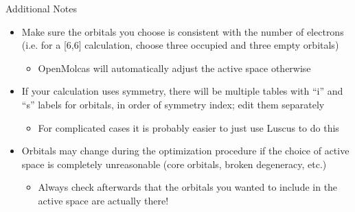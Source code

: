 \documentclass[12pt,aspectratio=169]{beamer}
\begin{document}
	\begin{frame}{Additional Notes}
		\begin{itemize}
			\item Make sure the orbitals you choose is consistent with the number of electrons (i.e. for a [6,6] calculation, choose three occupied and three empty orbitals)
			\begin{itemize}
				\item OpenMolcas will automatically adjust the active space otherwise
			\end{itemize}
			\item If your calculation uses symmetry, there will be multiple tables with ``i'' and ``s'' labels for orbitals, in order of symmetry index; edit them separately
			\begin{itemize}
				\item For complicated cases it is probably easier to just use Luscus to do this
			\end{itemize}
			\item Orbitals may change during the optimization procedure if the choice of active space is completely unreasonable (core orbitals, broken degeneracy, etc.)
			\begin{itemize}
				\item Always check afterwards that the orbitals you wanted to include in the active space are actually there!
			\end{itemize}
		\end{itemize}
	\end{frame}

	
\end{document}
